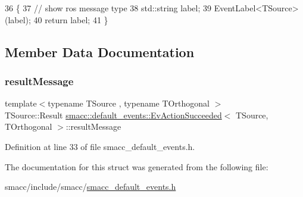 \begin{DoxyCode}
36   \{
37     \textcolor{comment}{// show ros message type}
38     std::string label;
39     EventLabel<TSource>(label);
40     \textcolor{keywordflow}{return} label;
41   \}
\end{DoxyCode}


\subsection{Member Data Documentation}
\mbox{\label{structsmacc_1_1default__events_1_1EvActionSucceeded_a2b9fab646bbd6918aa9ce597363881b5}} 
\subsubsection{\texorpdfstring{result\+Message}{resultMessage}}
{\footnotesize\ttfamily template$<$typename T\+Source , typename T\+Orthogonal $>$ \\
T\+Source\+::\+Result \hyperlink{structsmacc_1_1default__events_1_1EvActionSucceeded}{smacc\+::default\+\_\+events\+::\+Ev\+Action\+Succeeded}$<$ T\+Source, T\+Orthogonal $>$\+::result\+Message}



Definition at line 33 of file smacc\+\_\+default\+\_\+events.\+h.



The documentation for this struct was generated from the following file\+:\begin{DoxyCompactItemize}
\item 
smacc/include/smacc/\hyperlink{smacc__default__events_8h}{smacc\+\_\+default\+\_\+events.\+h}\end{DoxyCompactItemize}
